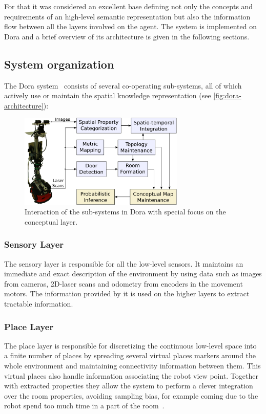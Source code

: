 For that it was considered an excellent base defining not only the concepts and
requirements of an high-level semantic representation but also the information flow
between all the layers involved on the agent.
The system is implemented on \Gls{Dora} and a brief overview of its architecture is
given in the following sections.

\subsection{System organization}
The \Gls{Dora} system~\cite{hanheide2011ijcai} consists of several co-operating
sub-systems, all of which actively use or maintain the spatial knowledge representation
(see \autoref{fig:dora-architecture}):

\begin{figure}[h]
\centering
\includegraphics[width=0.7\textwidth]{figures/dora-architecture.pdf}
\caption{\label{fig:dora-architecture}Interaction of the sub-systems
         in Dora with special focus on the conceptual layer.}
\end{figure}

\subsubsection*{Sensory Layer}
The sensory layer is responsible for all the low-level sensors.
It maintains an immediate and exact description of the environment by using
data such as images from cameras, 2D\hyp{}laser scans and odometry from encoders in the
movement motors. The information provided by it is used on the higher layers to extract
tractable information.

\subsubsection*{Place Layer}
The place layer is responsible for discretizing the continuous low-level space into
a finite number of places by spreading several virtual places markers around the whole
environment and maintaining connectivity information between them.
This virtual places also handle information associating the robot view point. Together
with extracted properties they allow the system to perform a clever integration over the
room properties, avoiding sampling bias, for example coming due to the robot spend too
much time in a part of the room~\cite{pronobis2010ijrr}.

